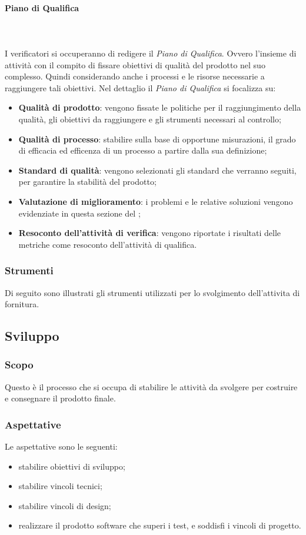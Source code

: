 			\paragraph{Piano di Qualifica} \mbox{} \\ \mbox{} \\
			I verificatori si occuperanno di redigere il \textit{Piano di Qualifica}. Ovvero l'insieme di attività con il compito di fissare obiettivi di qualità del prodotto nel suo complesso. Quindi considerando anche i processi e le risorse necessarie a raggiungere tali obiettivi. Nel dettaglio il \textit{Piano di Qualifica} si focalizza su:
			\begin{itemize}
				\item[] \textbf{Qualità di prodotto}: vengono fissate le politiche per il raggiungimento della qualità, gli obiettivi da raggiungere e gli strumenti necessari al controllo;
				\item[] \textbf{Qualità di processo}: stabilire sulla base di opportune misurazioni, il grado di efficacia ed efficenza di un processo a partire dalla sua definizione;
				\item[] \textbf{Standard di qualità}: vengono selezionati gli standard che verranno seguiti, per garantire la stabilità del prodotto;
				\item[] \textbf{Valutazione di miglioramento}: i problemi e le relative soluzioni vengono evidenziate in questa sezione del ;
				\item[] \textbf{Resoconto dell'attività di verifica}: vengono riportate i risultati delle metriche come resoconto dell'attività di qualifica.
			\end{itemize}
		\subsubsection{Strumenti}
		Di seguito sono illustrati gli strumenti utilizzati per lo svolgimento dell'attivita di fornitura.

	\subsection{Sviluppo}
		\subsubsection{Scopo}Questo è il processo che si occupa di stabilire le attività da svolgere per costruire e consegnare il prodotto finale.
		\subsubsection{Aspettative}
		Le aspettative sono le seguenti:
			\begin{itemize}
				\item[] stabilire obiettivi di sviluppo;
				\item[] stabilire vincoli tecnici;
				\item[] stabilire vincoli di design;
				\item[] realizzare il prodotto software che superi i test, e soddisfi i vincoli di progetto.
			\end{itemize}
